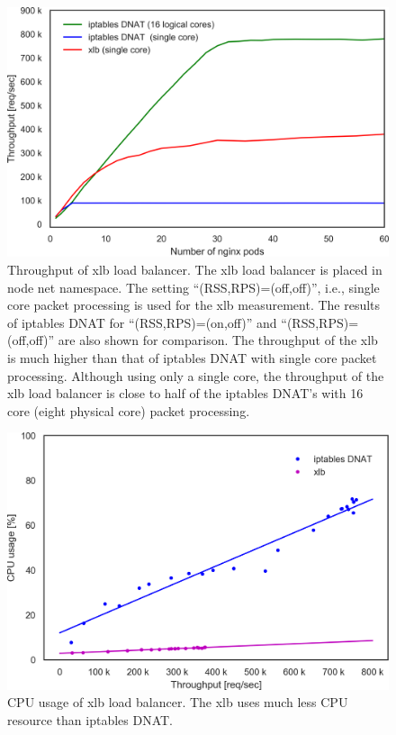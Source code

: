 \begin{figure}[h]
  \centering
  \includegraphics[width=0.8\columnwidth]{Figs/xlb_iptables_dnat_10g}
  \par\bigskip
  \centering
  \begin{minipage}{0.9\columnwidth}
    \caption[Throughput of xlb load balancer]{
      Throughput of xlb load balancer.
      The xlb load balancer is placed in node net namespace.
      The setting \enquote{(RSS,RPS)=(off,off)}, i.e., single core packet processing is used for the xlb measurement.
      The results of iptables DNAT for \enquote{(RSS,RPS)=(on,off)} and \enquote{(RSS,RPS)=(off,off)} are also shown for comparison.
      The throughput of the xlb is much higher than that of iptables DNAT with single core packet processing.
      Although using only a single core, the throughput of the xlb load balancer is close to half of the iptables DNAT's with 16 core (eight physical core) packet processing.
    }
    \label{fig:xlb_iptables_dnat_10g}
  \end{minipage}
\end{figure}


\begin{figure}[h]
  \centering
  \includegraphics[width=0.8\columnwidth]{Figs/cpu_usage_10g_xlb}
  \par\bigskip
  \centering
  \begin{minipage}{0.9\columnwidth}
    \caption[CPU usage of xlb load balancer]{
      CPU usage of xlb load balancer.
      The xlb uses much less CPU resource than iptables DNAT.
    }
    \label{fig:cpu_usage_10g_xlb}
  \end{minipage}
\end{figure}

